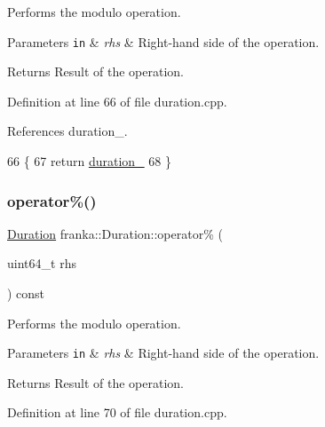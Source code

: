 Performs the modulo operation.


\begin{DoxyParams}[1]{Parameters}
\mbox{\tt in}  & {\em rhs} & Right-\/hand side of the operation.\\
\hline
\end{DoxyParams}
\begin{DoxyReturn}{Returns}
Result of the operation. 
\end{DoxyReturn}


Definition at line 66 of file duration.\+cpp.



References duration\+\_\+.


\begin{DoxyCode}
66                                                                \{
67   \textcolor{keywordflow}{return} \hyperlink{classfranka_1_1Duration_ae446c403b200f0dbf92fb51ca21e82ff}{duration\_} %
68 \}
\end{DoxyCode}
\mbox{\label{classfranka_1_1Duration_af06ff91f24d881c479768c1bcbf31a1e}} 
\subsubsection{\texorpdfstring{operator\%()}{operator\%()}\hspace{0.1cm}{\footnotesize\ttfamily [2/2]}}
{\footnotesize\ttfamily \hyperlink{classfranka_1_1Duration}{Duration} franka\+::\+Duration\+::operator\% (\begin{DoxyParamCaption}\item[{uint64\+\_\+t}]{rhs }\end{DoxyParamCaption}) const\hspace{0.3cm}{\ttfamily [noexcept]}}

Performs the modulo operation.


\begin{DoxyParams}[1]{Parameters}
\mbox{\tt in}  & {\em rhs} & Right-\/hand side of the operation.\\
\hline
\end{DoxyParams}
\begin{DoxyReturn}{Returns}
Result of the operation. 
\end{DoxyReturn}


Definition at line 70 of file duration.\+cpp.



